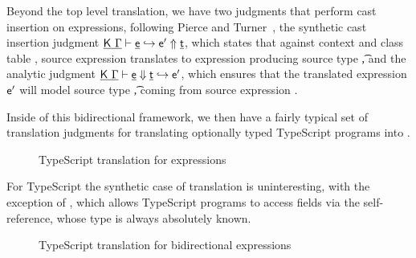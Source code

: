 \documentclass[a4paper,USenglish]{tex/lipics-v2016}
\begin{document}
Beyond the top level translation, we have two judgments that perform cast 
insertion on expressions, following Pierce and Turner~\cite{pierce:1998:local},
the synthetic cast insertion judgment $\GenCast\K\Env\e\ep\t$, which states that
against context \Env and class table \K, source expression \e translates to
\kafka expression \ep producing source type \t, and the analytic judgment
$\AnaCast\K\Env\e\ep\t$, which ensures that the translated \kafka expression 
$\ep$ will model source type \t, coming from source expression \e.

Inside of this bidirectional framework, we then have a fairly typical set of
translation judgments for translating optionally typed TypeScript programs into
\kafka.

\begin{figure}[!h]
\begin{mathpar}




\end{mathpar}
\caption{TypeScript translation for expressions}
\label{fig:tstrans_exp}
\end{figure}

For TypeScript the synthetic case of translation is uninteresting, with the 
exception of , which allows TypeScript programs to access fields
via the self-reference, whose type is always absolutely known.

\begin{figure}[!h]
\begin{mathpar}


\end{mathpar}
\caption{TypeScript translation for bidirectional expressions}
\label{fig:tstrans_exp2}
\end{figure}
\end{document}
